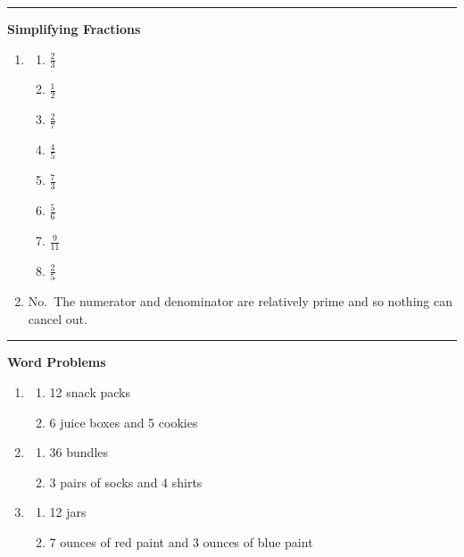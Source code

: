 \documentclass[
  letterpaper,
  DIV=11,
  numbers=noendperiod]{scrreprt}
\providecommand{\tightlist}{%
  \setlength{\itemsep}{0pt}\setlength{\parskip}{0pt}}
\begin{document}
\begin{center}\rule{0.5\linewidth}{0.5pt}\end{center}

\textbf{Simplifying Fractions}

\begin{enumerate}
\def\labelenumi{\arabic{enumi}.}
\setcounter{enumi}{3}
\tightlist
\item
  \begin{enumerate}
  \def\labelenumii{\alph{enumii}.}
  \tightlist
  \item
    \(\frac{2}{3}\)
  \item
    \(\frac{1}{2}\)
  \item
    \(\frac{2}{7}\)
  \item
    \(\frac{4}{5}\)
  \item
    \(\frac{7}{3}\)
  \item
    \(\frac{5}{6}\)
  \item
    \(\frac{9}{11}\)
  \item
    \(\frac{2}{5}\)
  \end{enumerate}
\item
  No.~The numerator and denominator are relatively prime and so nothing
  can cancel out.
\end{enumerate}

\begin{center}\rule{0.5\linewidth}{0.5pt}\end{center}

\textbf{Word Problems}

\begin{enumerate}
\def\labelenumi{\arabic{enumi}.}
\setcounter{enumi}{5}
\tightlist
\item
  \begin{enumerate}
  \def\labelenumii{\alph{enumii}.}
  \tightlist
  \item
    12 snack packs
  \item
    6 juice boxes and 5 cookies
  \end{enumerate}
\item
  \begin{enumerate}
  \def\labelenumii{\alph{enumii}.}
  \tightlist
  \item
    36 bundles
  \item
    3 pairs of socks and 4 shirts
  \end{enumerate}
\item
  \begin{enumerate}
  \def\labelenumii{\alph{enumii}.}
  \tightlist
  \item
    12 jars
  \item
    7 ounces of red paint and 3 ounces of blue paint
  \end{enumerate}
\end{enumerate}
\end{document}
